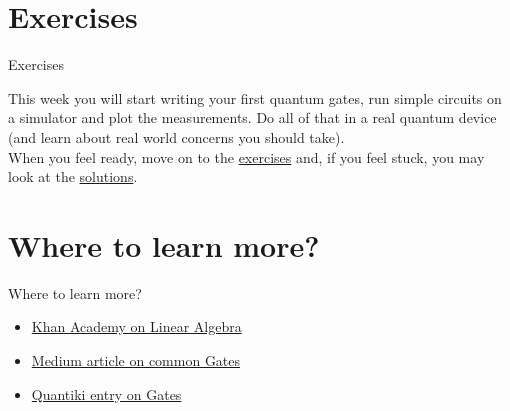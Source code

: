 \documentclass[aspectratio=43]{beamer}
\begin{document}
\section{Exercises}
\begin{frame}{Exercises}
\begin{card}[Hands-on]
    This week you will start writing your first quantum gates, run simple circuits on a simulator and plot the measurements. Do all of that in a real quantum device (and learn about real world concerns you should take).\\
    When you feel ready, move on to the \href{\weekThree/exercises/w3_01.ipynb}{exercises} and, if you feel stuck, you may look at the \href{\weekThree/exercises/w3_01_s.ipynb}{solutions}.
\end{card}
\pagenumber
\end{frame}






\section{Where to learn more?}
\begin{frame}{Where to learn more?}
\begin{card}
    \begin{itemize}
    \item \href{https://www.khanacademy.org/math/linear-algebra}{Khan Academy on Linear Algebra}
    \item \href{https://towardsdatascience.com/demystifying-quantum-gates-one-qubit-at-a-time-54404ed80640}{Medium article on common \q Gates}
    \item \href{https://www.quantiki.org/wiki/quantum-gates}{Quantiki entry on \q Gates}
    \end{itemize}
\end{card}
\end{frame}
\end{document}
